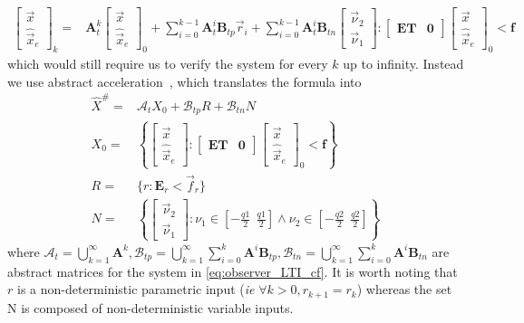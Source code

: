 \documentclass[runningheads,a4paper]{llncs}
\newcommand{\mat}[1]{\boldsymbol{#1}}
\begin{document}
\begin{align}
\label{eq:acc_observer_LTI_cf}
\left [\begin{array}{c}\vec{x}\\ \hat{\vec{x}}_e \end{array}\right]_k
=&\mat{A}_t^k
\left [\begin{array}{c}\vec{x}\\ \hat{\vec{x}}_e \end{array}\right]_0
+\sum_{i=0}^{k-1} \mat{A}_t^i \mat{B}_{tp} \vec{r}_i
+\sum_{i=0}^{k-1} \mat{A}_t^i \mat{B}_{tn}\left [\begin{array}{c}\vec{\nu}_2\\ \vec{\nu}_1\end{array}\right] :
 \left [\begin{array}{cc}\mat{E}\mat{T}&\mat{0}\end{array}\right] \left [\begin{array}{c}\vec{x}\\ \hat{\vec{x}}_e \end{array}\right]_0<\mat{f}
\end{align}
which would still require us to verify the system for every $k$ up to infinity. 
Instead we use abstract acceleration~\cite{cattaruzza2015unbounded}, which translates the formula into
%
\begin{align}
\label{eq:aa_observer_LTI_cf}
\hat{X}^\#
=&\mathcal{A}_t X_0+\mathcal{B}_{tp} R + \mathcal{B}_{tn} N\\
X_0 =&\left \{ \left[\begin{array}{c}\vec{x}\\ \hat{\vec{x}}_e \end{array}\right] :
 \left [\begin{array}{cc}\mat{E}\mat{T}&\mat{0}\end{array}\right] \left [\begin{array}{c}\vec{x}\\ \hat{\vec{x}}_e \end{array}\right]_0<\mat{f} \right\}\nonumber\\
 R =&\{r : \mat{E}_r < \vec{f}_r \}\nonumber\\
 N=&\left \{ \left[\begin{array}{c}\vec{\nu}_2\\ \vec{\nu}_1\end{array}\right] : \nu_1 \in \left[-\frac{q1}{2}\ \ \frac{q1}{2}\right] \wedge \nu_2 \in \left[-\frac{q2}{2}\ \ \frac{q2}{2}\right]  \right \}\nonumber
\end{align}
%
where $\mathcal{A}_t=\bigcup_{k=1}^\infty \mat{A}^k, \mathcal{B}_{tp}=\bigcup_{k=1}^\infty \sum_{i=0}^k\mat{A}^i\mat{B}_{tp}, \mathcal{B}_{tn}=\bigcup_{k=1}^\infty \sum_{i=0}^k\mat{A}^i\mat{B}_{tn}$ are abstract matrices for the system in \eqref{eq:observer_LTI_cf}. It is worth noting that $r$ is a non-deterministic parametric input (\emph{ie} $\forall k>0, r_{k+1} =r_k$) whereas the set N is composed of non-deterministic variable inputs.
\end{document}
